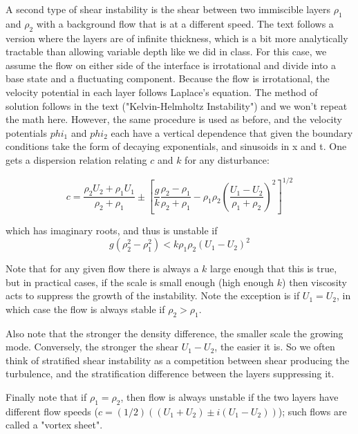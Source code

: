 \documentclass[11pt]{article}
\begin{document}
A second type of shear instability is the shear between two immiscible layers
$\rho_1$ and $\rho_2$ with a background flow that is at a different speed.  The
text follows a version where the layers are of infinite thickness, which is a
bit more analytically tractable than allowing variable depth like we did in
class.  For this case, we assume the flow on either side of the interface is
irrotational and divide into a base state and a fluctuating component.  Because
the flow is irrotational, the velocity potential in each layer follows
Laplace's equation.  The method of solution follows in the text
("Kelvin-Helmholtz Instability") and we won't repeat the math here.  However,
the same procedure is used as before, and the velocity potentials $phi_1$ and
$phi_2$ each have a vertical dependence that given the boundary conditions take
the form of decaying exponentials, and sinusoids in x and t.  One gets a
dispersion relation relating $c$ and $k$ for any disturbance:

\begin{equation}
  c  = \frac{\rho_2 U_2 + \rho_1 U_1}{\rho_2 + \rho_1} \pm
\left[\frac{g}{k}\frac{\rho_2 - \rho_1}{\rho_2+\rho_1} -
\rho_1\rho_2\left(\frac{U_1 - U_2}{\rho_1 + \rho_2} \right)^2 \right]^{1/2}
\end{equation}

which has imaginary roots, and thus is unstable if 
\begin{equation}
  g\left(\rho_2^2 - \rho_1^2 \right) < k\rho_1\rho_2\left(U_1-U_2\right)^2
\end{equation}

Note that for any given flow there is always a $k$ large enough that this is
true, but in practical cases, if the scale is small enough (high enough $k$)
then viscosity acts to suppress the growth of the instability.  Note the
exception is if $U_1=U_2$, in which case the flow is always stable if $\rho_2 >
\rho_1$.  

Also note that the stronger the density difference, the smaller scale the
growing mode.  Conversely, the stronger the shear $U_1-U_2$, the easier it is. 
So we often think of stratified shear instability as a competition between
shear producing the turbulence, and the stratification difference between the
layers suppressing it.  

Finally note that if $\rho_1 = \rho_2$, then flow is always unstable if the two
layers have different flow speeds ($c = (1/2)\left((U_1 + U_2)\pm
i(U_1-U_2)\right)$); such flows are called a "vortex sheet".  
\end{document}

